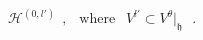 \begin{equation} \label{list}  
\mathcal{H} ^{(0,l')}\ \ , \ \ \mbox{ where } \ \ 
   V^{l'} \subset V^{\theta} |_{\mathfrak{h}} \ \ \  .   
\end{equation} 
